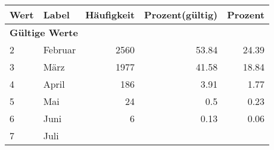     \begin{longtable}{lXrrr}
     \toprule
     \textbf{Wert} & \textbf{Label} & \textbf{Häufigkeit} & \textbf{Prozent(gültig)} & \textbf{Prozent} \\
     \endhead
     \midrule
     \multicolumn{5}{l}{\textbf{Gültige Werte}}\\

     2 &
     \multicolumn{1}{X}{ Februar   } &


       \num{2560} &
       \num[round-mode=places,round-precision=2]{53,84} &
         \num[round-mode=places,round-precision=2]{24,39} \\

     3 &
     \multicolumn{1}{X}{ März   } &


       \num{1977} &
       \num[round-mode=places,round-precision=2]{41,58} &
         \num[round-mode=places,round-precision=2]{18,84} \\

     4 &
     \multicolumn{1}{X}{ April   } &


       \num{186} &
       \num[round-mode=places,round-precision=2]{3,91} &
         \num[round-mode=places,round-precision=2]{1,77} \\

     5 &
     \multicolumn{1}{X}{ Mai   } &


       \num{24} &
       \num[round-mode=places,round-precision=2]{0,5} &
         \num[round-mode=places,round-precision=2]{0,23} \\

     6 &
     \multicolumn{1}{X}{ Juni   } &


       \num{6} &
       \num[round-mode=places,round-precision=2]{0,13} &
         \num[round-mode=places,round-precision=2]{0,06} \\

     7 &
     \multicolumn{1}{X}{ Juli   } &



\end{longtable}
